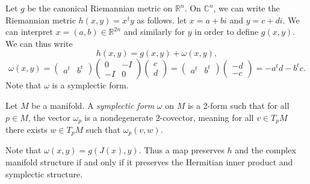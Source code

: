Let $g$ be the canonical Riemannian metric on $\mathbb{R} ^n$. On $\mathbb{C} ^n$, we can write the Riemannian metric $h(x,y)=x^\dagger y$ as follows. let $x=a+bi$ and $y=c+di$. We can interpret $x=(a,b)\in\mathbb{R} ^{2n} $ and similarly for $y$ in order to define $g(x,y)$. We can thus write
\[
	h(x,y)=g(x,y)+\omega (x,y),
\]
\[
	 \omega (x,y)=\begin{pmatrix}
	a^t & b^t
	\end{pmatrix}\begin{pmatrix}
	0 & -I \\
	-I & 0
	\end{pmatrix}\begin{pmatrix}
	c \\
	d
	\end{pmatrix}=\begin{pmatrix}
	a^t & b^t
	\end{pmatrix}\begin{pmatrix}
	-d \\
	-c
	\end{pmatrix}=-a^t d - b^tc
.\]
Note that $\omega $ is a symplectic form.

\begin{definition}\label{1.1.6}
	Let $M$ be a manifold. A \emph{symplectic form} $\omega $ on $M$ is a 2-form such that for all $p\in M$, the vector $\omega _p$ is a nondegenerate 2-covector, meaning for all $v\in T_pM$ there exists $w\in T_pM$ such that $\omega_p(v,w)$.
\end{definition}

Note that $\omega (x,y)=g(J(x),y)$. Thus a map preserves $h$ and the complex manifold structure if and only if it preserves the Hermitian inner product and symplectic structure.
